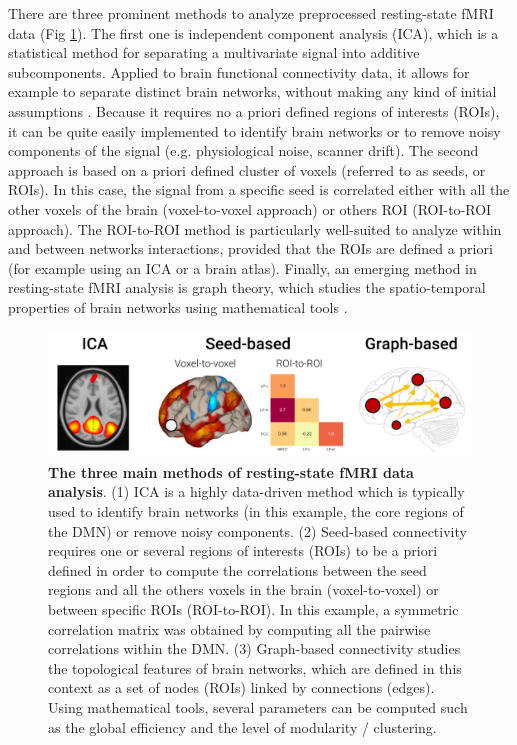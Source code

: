 There are three prominent methods to analyze preprocessed resting-state fMRI data (Fig \ref{fig:methods:ana-methods}). The first one is independent component analysis (ICA), which is a statistical method for separating a multivariate signal into additive subcomponents. Applied to brain functional connectivity data, it allows for example to separate distinct brain networks, without making any kind of initial assumptions \citep{beckmann_investigations_2005}. Because it requires no a priori defined regions of interests (ROIs), it can be quite easily implemented to identify brain networks or to remove noisy components of the signal (e.g. physiological noise, scanner drift). The second approach is based on a priori defined cluster of voxels (referred to as seeds, or ROIs). In this case, the signal from a specific seed is correlated either with all the other voxels of the brain (voxel-to-voxel approach) or others ROI (ROI-to-ROI approach). The ROI-to-ROI method is particularly well-suited to analyze within and between networks interactions, provided that the ROIs are defined a priori (for example using an ICA or a brain atlas). Finally, an emerging method in resting-state fMRI analysis is graph theory, which studies the spatio-temporal properties of brain networks using mathematical tools \citep{bullmore_complex_2009}.

\begin{figure}[htb]
	\includegraphics[width=\textwidth]{Fig/Methods/fMRI_seed_graph_ica/fMRI_seed_graph_ica.png}
	\caption[The three main methods of resting-state fMRI data analysis]{\textbf{The three main methods of resting-state fMRI data analysis}. (1) ICA is a highly data-driven method which is typically used to identify brain networks (in this example, the core regions of the DMN) or remove noisy components. (2) Seed-based connectivity requires one or several regions of interests (ROIs) to be a priori defined in order to compute the correlations between the seed regions and all the others voxels in the brain (voxel-to-voxel) or between specific ROIs (ROI-to-ROI). In this example, a symmetric correlation matrix was obtained by computing all the pairwise correlations within the DMN. (3) Graph-based connectivity studies the topological features of brain networks, which are defined in this context as a set of nodes (ROIs) linked by connections (edges). Using mathematical tools, several parameters can be computed such as the global efficiency and the level of modularity / clustering.}
	\label{fig:methods:ana-methods}
\end{figure}

